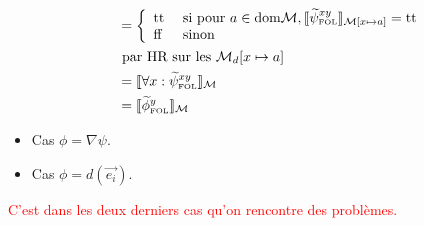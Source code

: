 \documentclass[12pt]{article}
\newcommand{\FOL}{\ensuremath{\textup{\tiny{}FOL}}}
\newcommand{\false}{\textup{ff}}
\newcommand{\true}{\textup{tt}}
\newcommand{\M}{\ensuremath{\mathcal{M}}}
\newcommand{\raph}[1]{\textcolor{red}{#1}}
\newcommand{\bpar}[1]{\marginpar{\color{myblue}\footnotesize\raggedright#1}}
\begin{document}
\begin{itemize}
\begin{align*}
    &= \left \{
      \begin{array}{l l}
        \true & \textup{ si pour } a \in \textup{dom} \mathcal{M}, \llbracket \widetilde{\psi}_\FOL^{xy} \rrbracket_{\mathcal{M}[x \mapsto a]} = \true \\
        \false & \textup{ sinon }
      \end{array}
                 \right . \\
    & \textup{ par HR sur les } \M_d[x \mapsto a] \\
    &= \llbracket \forall x : \widetilde{\psi}_\FOL^{xy} \rrbracket_{\mathcal{M}} \\
    &= \llbracket \widetilde{\phi}_\FOL^y \rrbracket_{\mathcal{M}}
  \end{align*}

\item
  Cas $\phi = \nabla \psi$.
\item
  Cas $\phi = d(\vec{e_i})$.
\end{itemize}

\raph{%
  C'est dans les deux derniers cas qu'on rencontre des problèmes.}
\end{document}
